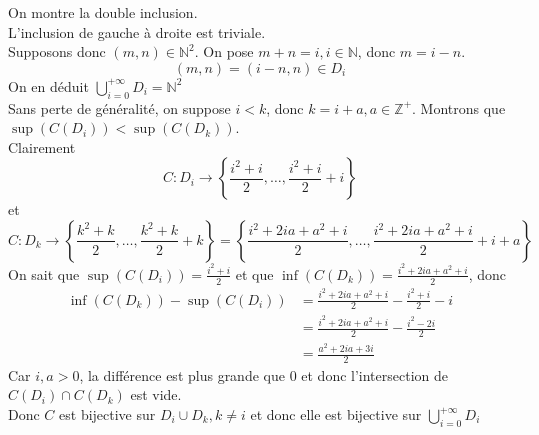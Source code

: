 \documentclass[11pt, a4paper]{article}
\begin{document}
		On montre la double inclusion.\\
		L'inclusion de gauche à droite est triviale.\\
		Supposons donc $(m,n) \in \mathbb{N}^{2}$. On pose $m+n=i, i \in \mathbb{N}$, donc $m=i-n$.
		\[ 
			(m,n) = (i-n,n) \in D_i
		\]
		On en déduit $\bigcup_{i=0}^{+\infty} D_i = \mathbb{N}^{2}$\\
		Sans perte de généralité, on suppose $i<k$, donc $k= i+a, a \in \mathbb{Z}^{+} $.
		Montrons que $\sup(C(D_i)) < \sup(C(D_k))$.\\
		Clairement
		\[ 
			C: D_i \to \left\{ \frac{i^{2}+i}{2}, \ldots,  \frac{i^{2}+i}{2}+i\right\} 
		\]
		et 
		\[ 
			C: D_k \to \left\{ \frac{k^{2}+k}{2}, \ldots,  \frac{k^{2}+k}{2}+k\right\} = \left\{ \frac{i^{2}+2ia+a^{2}+i}{2}, \ldots, \frac{i^{2}+2ia+a^{2}+i}{2} + i+a\right\} 
		\]
		On sait que $\sup(C(D_i))= \frac{i^{2}+i}{2}$ et que $\inf(C(D_k))= \frac{i^{2}+2ia+a^{2}+i}{2}$, donc
		\begin{align*}
			\inf(C(D_k)) - \sup(C(D_i)) &= \frac{i^{2}+2ia+a^{2}+i}{2} -\frac{i^{2}+i}{2}-i\\
						&= \frac{i^{2}+2ia+a^{2}+i}{2} - \frac{i^{2}-2i}{2}\\
						    &=  \frac{a^{2}+2ia+3i}{2}
		\end{align*}
		Car $i,a> 0$, la différence est plus grande que $0$ et donc l'intersection de $C(D_i) \cap C(D_k)$ est vide.\\
		Donc $C$ est bijective sur $D_i \cup D_k, k \neq i$ et donc elle est bijective sur $\bigcup_{i=0}^{+ \infty } D_i$
\end{document}
